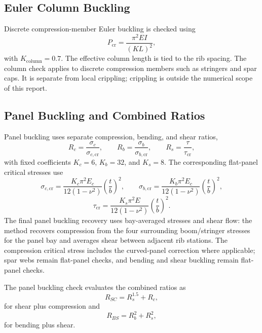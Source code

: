 \documentclass[11pt]{article}
\begin{document}
\subsection{Euler Column Buckling}

Discrete compression-member Euler buckling is checked using
\begin{equation}
  P_{\mathrm{cr}} = \frac{\pi^2 E I}{(K L)^2},
\end{equation}
with $K_{\mathrm{column}} = 0.7$. The effective column length is tied to the rib spacing.
The column check applies to discrete compression members such as stringers and spar caps. It is separate from local crippling; crippling is outside the numerical scope of this report.

\subsection{Panel Buckling and Combined Ratios}

Panel buckling uses separate compression, bending, and shear ratios,
\begin{equation}
  R_c = \frac{\sigma_c}{\sigma_{c,\mathrm{cr}}}, \qquad
  R_b = \frac{\sigma_b}{\sigma_{b,\mathrm{cr}}}, \qquad
  R_s = \frac{\tau}{\tau_{\mathrm{cr}}},
\end{equation}
with fixed coefficients $K_c=6$, $K_b=32$, and $K_s=8$. The corresponding flat-panel critical stresses use
\begin{equation}
  \sigma_{c,\mathrm{cr}} =
  \frac{K_c \pi^2 E_c}{12(1-\nu^2)}\left(\frac{t}{b}\right)^2,
  \qquad
  \sigma_{b,\mathrm{cr}} =
  \frac{K_b \pi^2 E_c}{12(1-\nu^2)}\left(\frac{t}{b}\right)^2,
\end{equation}
\begin{equation}
  \tau_{\mathrm{cr}} =
  \frac{K_s \pi^2 E}{12(1-\nu^2)}\left(\frac{t}{b}\right)^2.
\end{equation}
The final panel buckling recovery uses bay-averaged stresses and shear flow: the method recovers compression from the four surrounding boom/stringer stresses for the panel bay and averages shear between adjacent rib stations. The compression critical stress includes the curved-panel correction where applicable; spar webs remain flat-panel checks, and bending and shear buckling remain flat-panel checks.

The panel buckling check evaluates the combined ratios as
\begin{equation}
  R_{SC} = R_s^{1.5} + R_c,
\end{equation}
for shear plus compression and
\begin{equation}
  R_{BS} = R_b^2 + R_s^2,
\end{equation}
for bending plus shear.
\end{document}
